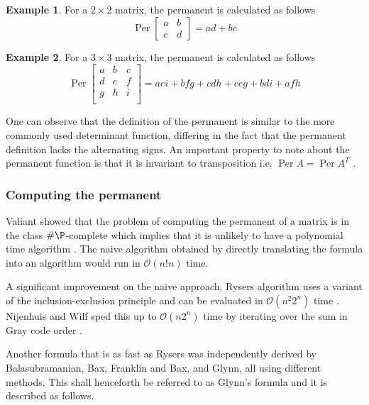 \documentclass[ %
                    author={Manan Vaswani},
                supervisor={Dr. Raphael Clifford},
                    degree={MEng},
                     title={A multi-core CPU implementation of the classical Boson Sampling algorithm},
                  subtitle={},
                      type={},
                      year={2019} ]{dissertation}
\theoremstyle{plain}
\theoremstyle{definition}
\newtheorem{example}{Example}
\DeclareMathOperator*{\Per}{\mathrm{Per}}
\begin{document}
\begin{example}
For a $2 \times 2$ matrix, the permanent is calculated as follows
\begin{equation}
\Per 
\begin{bmatrix}
a & b \\
c & d
\end{bmatrix}
= ad + bc
\end{equation}
\end{example}
\begin{example}
For a $3 \times 3$ matrix, the permanent is calculated as follows
\begin{equation}
\Per 
\begin{bmatrix}
a & b & c\\
d & e & f\\
g & h & i\\ 
\end{bmatrix}
= aei +bfg + cdh + ceg + bdi + afh
\end{equation}
\end{example}
One can observe that the definition of the permanent is similar to the more commonly used determinant function, differing in the fact that the permanent definition lacks the alternating signs. An important property to note about the permanent function is that it is invariant to transposition i.e. $\Per A = \Per A^T$ \cite{ryser_1963}.

\subsubsection{Computing the permanent}\label{prelim_permanent_calc}
Valiant showed that the problem of computing the permanent of a matrix is in the class $\# \P$-complete which implies that it is unlikely to have a polynomial time algorithm \cite{valiant1979}. The naive algorithm obtained by directly translating the formula into an algorithm would run in $\mathcal{O}(n!n)$ time.

A significant improvement on the naive approach, Rysers algorithm uses a variant of the inclusion-exclusion principle and can be evaluated in $\mathcal{O}(n^2 2^n)$ time  \cite{ryser_1963}. Nijenhuis and Wilf sped this up to $\mathcal{O}(n2^n)$ time by iterating over the sum in Gray code order \cite{Nijenhuis1978}.

Another formula that is as fast as Rysers was independently derived by Balasubramanian\cite{balasubramanian1980}, Bax\cite{bax1998}, Franklin and Bax\cite{bax1996}, and Glynn\cite{glynn2010}, all using different methods. This shall henceforth be referred to as Glynn's formula and it is described as follows.
\end{document}
